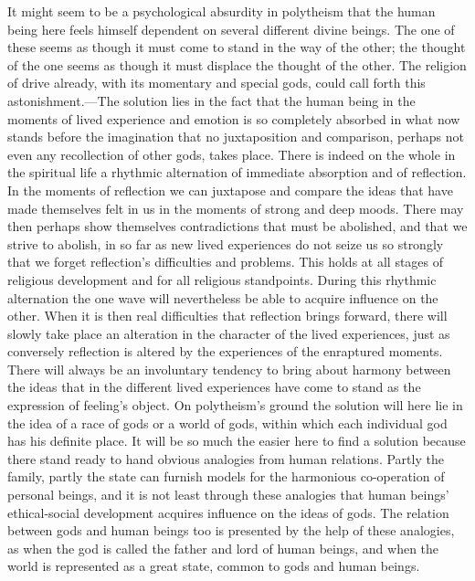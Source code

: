 \documentclass[12pt,a4paper]{book}
\newcommand{\opage}[1]{\marginnote{\footnotesize\textit{[#1]}}}
\begin{document}
It might seem to be a psychological absurdity in polytheism that the human being here feels
himself dependent on several different divine beings. The one of these seems as though it must
come to stand in the way of the other; the thought of the one seems as though it must displace
the thought of the other. The religion of drive already, with its momentary and special gods,
could call forth this astonishment.---The solution lies in the fact that the human being in the
moments of lived experience and emotion is so completely absorbed in what now stands before the
imagination that no juxtaposition and comparison, perhaps not even any recollection of other
gods, takes place. There is indeed on the whole in the spiritual life a rhythmic alternation of
immediate absorption and of reflection. In the moments of reflection we can juxtapose and compare
the ideas that have made themselves felt in us in the moments of strong and deep moods. There may
then perhaps show themselves contradictions that must be abolished, and that we strive to abolish,
in so far as new lived experiences do not seize us so strongly that we forget reflection's
difficulties and problems. This holds at all stages of religious development and for all religious
standpoints. During this rhythmic alternation the one wave will nevertheless be able to acquire
influence on the other. When it is then real difficulties that reflection brings forward, there
will slowly take place an alteration in the character of the lived experiences, just as conversely
reflection is altered 
\opage{101}by the experiences of the enraptured moments. There will always be an
involuntary tendency to bring about harmony between the ideas that in the different lived
experiences have come to stand as the expression of feeling's object. On polytheism's ground the
solution will here lie in the idea of a race of gods or a world of gods, within which each
individual god has his definite place. It will be so much the easier here to find a solution
because there stand ready to hand obvious analogies from human relations. Partly the family, partly
the state can furnish models for the harmonious co-operation of personal beings, and it is not
least through these analogies that human beings' ethical-social development acquires influence on
the ideas of gods. The relation between gods and human beings too is presented by the help of these
analogies, as when the god is called the father and lord of human beings, and when the world is
represented as a great state, common to gods and human beings.
\end{document}
